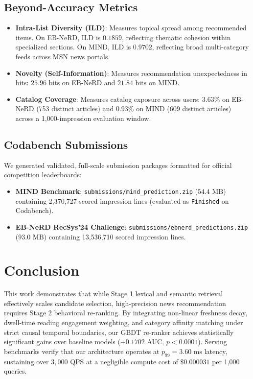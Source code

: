 \documentclass[11pt,a4paper]{article}
\begin{document}
\subsection{Beyond-Accuracy Metrics}
\begin{itemize}[noitemsep,topsep=1pt,leftmargin=*]
    \item \textbf{Intra-List Diversity (ILD)}: Measures topical spread among recommended items. On EB-NeRD, ILD is $0.1859$, reflecting thematic cohesion within specialized sections. On MIND, ILD is $0.9702$, reflecting broad multi-category feeds across MSN news portals.
    \item \textbf{Novelty (Self-Information)}: Measures recommendation unexpectedness in bits: $25.96\text{ bits}$ on EB-NeRD and $21.84\text{ bits}$ on MIND.
    \item \textbf{Catalog Coverage}: Measures catalog exposure across users: $3.63\%$ on EB-NeRD (753 distinct articles) and $0.93\%$ on MIND (609 distinct articles) across a 1,000-impression evaluation window.
\end{itemize}

\subsection{Codabench Submissions}
We generated validated, full-scale submission packages formatted for official competition leaderboards:
\begin{itemize}[noitemsep,topsep=1pt,leftmargin=*]
    \item \textbf{MIND Benchmark}: \texttt{submissions/mind\_prediction.zip} ($54.4\text{ MB}$) containing 2,370,727 scored impression lines (evaluated as \texttt{Finished} on Codabench).
    \item \textbf{EB-NeRD RecSys'24 Challenge}: \texttt{submissions/ebnerd\_predictions.zip} ($93.0\text{ MB}$) containing 13,536,710 scored impression lines.
\end{itemize}

\section{Conclusion}
This work demonstrates that while Stage 1 lexical and semantic retrieval effectively scales candidate selection, high-precision news recommendation requires Stage 2 behavioral re-ranking. By integrating non-linear freshness decay, dwell-time reading engagement weighting, and category affinity matching under strict causal temporal boundaries, our GBDT re-ranker achieves statistically significant gains over baseline models ($+0.1702$ AUC, $p < 0.0001$). Serving benchmarks verify that our architecture operates at $p_{99} = 3.60\text{ ms}$ latency, sustaining over $3,000\text{ QPS}$ at a negligible compute cost of $\$0.000031$ per 1,000 queries.
\end{document}
